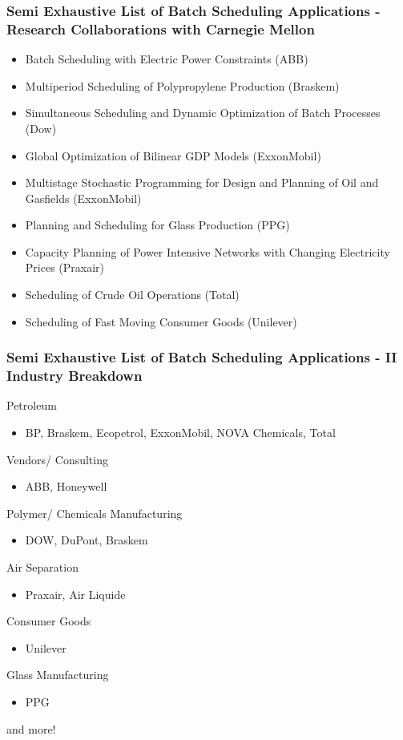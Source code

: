 \begin{frame}\frametitle{Semi Exhaustive List of Batch Scheduling Applications - Research Collaborations with Carnegie Mellon}
	\begin{itemize}
		\item	Batch Scheduling with Electric Power Constraints (ABB) 
		\item	Multiperiod Scheduling of Polypropylene Production (Braskem) 
		\item	Simultaneous Scheduling and Dynamic Optimization of Batch Processes (Dow) 
		\item	Global Optimization of Bilinear GDP Models (ExxonMobil) 
		\item	Multistage Stochastic Programming for Design and Planning of Oil and Gasfields (ExxonMobil) 
		\item	Planning and Scheduling for Glass Production (PPG) 
		\item	Capacity Planning of Power Intensive Networks with Changing Electricity Prices (Praxair) 
		\item	Scheduling of Crude Oil Operations (Total) 
		\item	Scheduling of Fast Moving Consumer Goods (Unilever) 
	\end{itemize}
	\cite{Gman-adv} 
\end{frame}

\begin{frame}\frametitle{Semi Exhaustive List of Batch Scheduling Applications - II Industry Breakdown}
	
	Petroleum 
	\begin{itemize}
		\item	BP, Braskem, Ecopetrol, ExxonMobil, NOVA Chemicals, Total 
	\end{itemize}
	
	Vendors/ Consulting 
	\begin{itemize}
		\item	ABB, Honeywell 
	\end{itemize}
	
	Polymer/ Chemicals Manufacturing 
	\begin{itemize}
		\item	DOW, DuPont, Braskem 
	\end{itemize}
	
	Air Separation 
	\begin{itemize}
		\item	Praxair, Air Liquide 
	\end{itemize}
	
	Consumer Goods 
	\begin{itemize}
		\item	Unilever 
	\end{itemize}
	
	Glass Manufacturing 
	\begin{itemize}
		\item	PPG 
	\end{itemize}
	
	and more! 
\end{frame}

